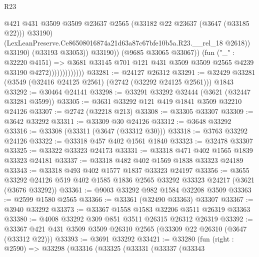 \begin{lexlean}{R23}
\begin{coremodule}
                                          @421
                                          @431
                                          @3509
                                          @3509
                                          @23637
                                          @2565
                                          (@33182 @22 @23637 (@3647 (@33185 @22)))
                                          @33190)
                                        (LexLeanPreserve.Ce86508016874a21d63a87c67bfe10b5a.R23.__rel_18
                                          @2618))
                                      @33190)
                                    (@33193 @33053))
                                  @33190))
                              (@9685 @33065 @33067))
                            (fun ("_" : @32220 @4151) =>
                            @3681
                              @33145
                              @701
                              @121
                              @431
                              @3509
                              @3509
                              @2565
                              @4239
                              @33190
                              @4272)))))))))))))
@33281 := @24127 @26312
@33291 := @32429 @33281 (@3549 (@32416 @24125 @2561) (@2742 (@32292 @24125 @2561))) @1843
@33292 := @30464 @24141
@33298 := @33291 @33292 @32444 (@3621 (@32447 @33281 @3599))
@33305 := @3631 @33292 @121 @419 @1841 @3509 @32210 @24126
@33307 := @2742 (@32218 @213)
@33308 := @33305 @33307
@33309 := @3642 @33292
@33311 := @33309 @30 @24126
@33312 := @3648 @33292
@33316 := @33308 (@33311 (@3647 (@33312 @30)))
@33318 := @3763 @33292 @24126
@33322 := @33318 @457 @402 @1561 @1840
@33323 := @32478 @33307
@33325 := @33322 @33323 @24173
@33331 := @33318 @471 @402 @1565 @1839 @33323 @24181
@33337 := @33318 @482 @402 @1569 @1838 @33323 @24189
@33343 := @33318 @493 @402 @1577 @1837 @33323 @24197
@33356 := @3655
    @33292
    @24126
    @519
    @402
    @1585
    @1836
    @2565
    @33292
    @33323
    @24217
    (@3621 (@3676 @33292))
@33361 := @9003 @33292 @982 @1584 @32208 @3509
@33363 := @2599 @1580 @2565
@33366 := @33361 (@32490 @33363) @33307
@33367 := @3940 @33292
@33373 := @33367 @1558 @1583 @32206 @3511 @26319 @33363
@33380 := @4008 @33292 @309 @851 @3511 @26315 @26312 @26319
@33392 := @33367 @421 @431 @3509 @3509 @26310 @2565 (@33309 @22 @26310 (@3647 (@33312 @22)))
@33393 := @3691 @33292
@33421 := @33280
    (fun (right : @2590) =>
    @33298
      (@33316
        (@33325
          (@33331
            (@33337
              (@33343

\end{coremodule}
\end{lexlean}
